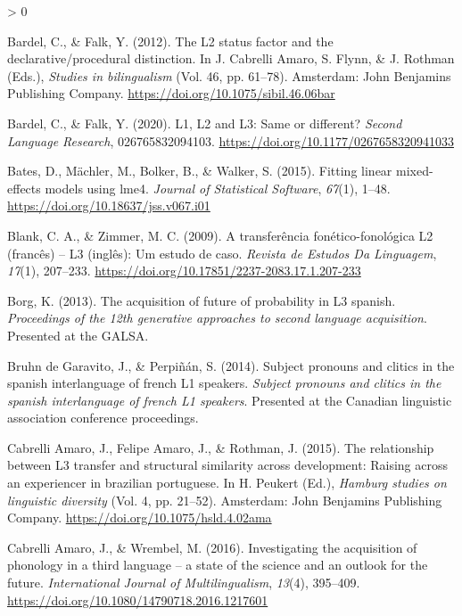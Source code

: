 \documentclass[
  english,
  man]{apa6}
\newlength{\cslhangindent}
\newenvironment{CSLReferences}[2] %
 {%
  \setlength{\parindent}{0pt}
  \ifodd #1 \everypar{\setlength{\hangindent}{\cslhangindent}}\ignorespaces\fi
  \ifnum #2 > 0
  \setlength{\parskip}{#2\baselineskip}
  \fi
 }%
 {}
\begin{document}
\begin{CSLReferences}{1}{0}
\leavevmode\hypertarget{ref-cabrelli_amaro_l2_2012}{}%
Bardel, C., \& Falk, Y. (2012). The L2 status factor and the declarative/procedural distinction. In J. Cabrelli Amaro, S. Flynn, \& J. Rothman (Eds.), \emph{Studies in bilingualism} (Vol. 46, pp. 61--78). Amsterdam: John Benjamins Publishing Company. \url{https://doi.org/10.1075/sibil.46.06bar}

\leavevmode\hypertarget{ref-bardel_l1_2020}{}%
Bardel, C., \& Falk, Y. (2020). L1, L2 and L3: Same or different? \emph{Second Language Research}, 026765832094103. \url{https://doi.org/10.1177/0267658320941033}

\leavevmode\hypertarget{ref-R-lme4}{}%
Bates, D., Mächler, M., Bolker, B., \& Walker, S. (2015). Fitting linear mixed-effects models using {lme4}. \emph{Journal of Statistical Software}, \emph{67}(1), 1--48. \url{https://doi.org/10.18637/jss.v067.i01}

\leavevmode\hypertarget{ref-blank_transferencia_2009}{}%
Blank, C. A., \& Zimmer, M. C. (2009). A transferência fonético-fonológica L2 (francês) -- L3 (inglês): Um estudo de caso. \emph{Revista de Estudos Da Linguagem}, \emph{17}(1), 207--233. \url{https://doi.org/10.17851/2237-2083.17.1.207-233}

\leavevmode\hypertarget{ref-borg_acquisition_2013}{}%
Borg, K. (2013). The acquisition of future of probability in L3 spanish. \emph{Proceedings of the 12th generative approaches to second language acquisition}. Presented at the {GALSA}.

\leavevmode\hypertarget{ref-bruhn_de_garavito_subject_2014}{}%
Bruhn de Garavito, J., \& Perpiñán, S. (2014). Subject pronouns and clitics in the spanish interlanguage of french L1 speakers. \emph{Subject pronouns and clitics in the spanish interlanguage of french L1 speakers}. Presented at the Canadian linguistic association conference proceedings.

\leavevmode\hypertarget{ref-peukert_relationship_2015}{}%
Cabrelli Amaro, J., Felipe Amaro, J., \& Rothman, J. (2015). The relationship between L3 transfer and structural similarity across development: Raising across an experiencer in brazilian portuguese. In H. Peukert (Ed.), \emph{Hamburg studies on linguistic diversity} (Vol. 4, pp. 21--52). Amsterdam: John Benjamins Publishing Company. \url{https://doi.org/10.1075/hsld.4.02ama}

\leavevmode\hypertarget{ref-cabrelli_amaro_investigating_2016}{}%
Cabrelli Amaro, J., \& Wrembel, M. (2016). Investigating the acquisition of phonology in a third language -- a state of the science and an outlook for the future. \emph{International Journal of Multilingualism}, \emph{13}(4), 395--409. \url{https://doi.org/10.1080/14790718.2016.1217601}


\end{CSLReferences}
\end{document}
